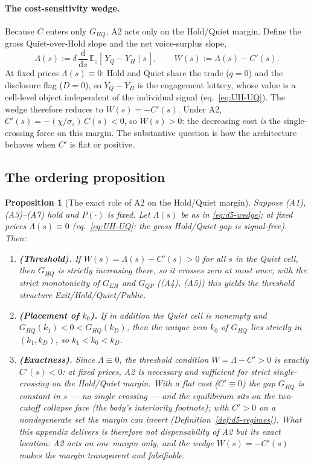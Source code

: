 \documentclass[11pt]{article}
\newtheorem{proposition}{Proposition}
\newcommand{\E}{\mathbb{E}}
\newcommand{\1}{\mathbf{1}}
\begin{document}
\paragraph{The cost-sensitivity wedge.}
Because $C$ enters only $G_{HQ}$, A2 acts only on the Hold/Quiet margin. Define the gross Quiet-over-Hold slope and the net voice-surplus slope,
\begin{equation}\label{eq:d5-wedge}
  \Lambda(s) := \delta\,\frac{\mathrm d}{\mathrm d s}\,\E_z[\,Y_Q - Y_H \mid s\,],
  \qquad W(s):=\Lambda(s)-C'(s).
\end{equation}
At fixed prices $\Lambda(s)\equiv0$: Hold and Quiet share the trade ($q=0$) and the disclosure flag ($D=0$), so $Y_Q-Y_H$ is the engagement lottery, whose value is a cell-level object independent of the individual signal (eq.~\eqref{eq:UH-UQ}). The wedge therefore reduces to $W(s)=-C'(s)$. Under A2, $C'(s)=-(\chi/\sigma_s)\,C(s)<0$, so $W(s)>0$: the decreasing cost \emph{is} the single-crossing force on this margin. The substantive question is how the architecture behaves when $C'$ is flat or positive.

\subsection{The ordering proposition}
\label{app:d5-ordering}

\begin{proposition}[The exact role of A2 on the Hold/Quiet margin]\label{prop:d5-a2}
Suppose \textup{(A1)}, \textup{(A3)}--\textup{(A7)} hold and $P(\cdot)$ is fixed. Let $\Lambda(s)$ be as in \eqref{eq:d5-wedge}; at fixed prices $\Lambda(s)\equiv0$ (eq.~\eqref{eq:UH-UQ}: the gross Hold/Quiet gap is signal-free). Then:
\begin{enumerate}
\item[\textnormal{(a)}] \textbf{(Threshold).} If $W(s)=\Lambda(s)-C'(s)>0$ for all $s$ in the Quiet cell, then $G_{HQ}$ is strictly increasing there, so it crosses zero at most once; with the strict monotonicity of $G_{EH}$ and $G_{QP}$ (\textup{(A4)}, \textup{(A5)}) this yields the threshold structure Exit/Hold/Quiet/Public.
\item[\textnormal{(b)}] \textbf{(Placement of $k_0$).} If in addition the Quiet cell is nonempty and $G_{HQ}(k_1)<0<G_{HQ}(k_D)$, then the unique zero $k_0$ of $G_{HQ}$ lies strictly in $(k_1,k_D)$, so $k_1<k_0<k_D$.
\item[\textnormal{(c)}] \textbf{(Exactness).} Since $\Lambda\equiv0$, the threshold condition $W=\Lambda-C'>0$ is exactly $C'(s)<0$: at fixed prices, A2 is \emph{necessary and sufficient} for strict single-crossing on the Hold/Quiet margin. With a flat cost ($C'\equiv0$) the gap $G_{HQ}$ is constant in $s$ --- no single crossing --- and the equilibrium sits on the two-cutoff collapse face (the body's interiority footnote); with $C'>0$ on a nondegenerate set the margin can invert (Definition~\ref{def:d5-regimes}). What this appendix delivers is therefore not dispensability of A2 but its \emph{exact location}: A2 acts on one margin only, and the wedge $W(s)=-C'(s)$ makes the margin transparent and falsifiable.
\end{enumerate}
\end{proposition}
\end{document}
